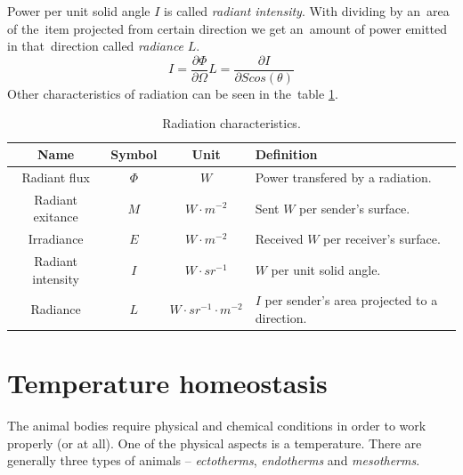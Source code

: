 Power per unit solid angle $I$ is called {\it radiant intensity}. With dividing by an~area of the~item
projected from certain direction we get an~amount of power emitted in that~direction called {\it radiance} $L$.
\begin{subequations}
\begin{equation}
I = \frac{\partial \Phi}{\partial \Omega}
\end{equation}
\begin{equation}
L = \frac{\partial I}{\partial S cos(\theta)}
\end{equation}
\end{subequations}
Other characteristics of radiation can be seen in the~table \ref{table:units}. \cite{iso800007} \cite{TemperatureMeasuring}

\begin{table}
\begin{tabular}{|c|c|c|l|} \hline
\textbf{Name}             & \textbf{Symbol} & \textbf{Unit}                 & \textbf{Definition}                             \\ \hline
Radiant flux        & $\Phi$          & $W$                           & Power transfered by a radiation.                \\ \hline
Radiant exitance    & $M$             & $W\cdot m^{-2}$               & Sent $W$ per sender's surface.                  \\ \hline 
Irradiance          & $E$             & $W\cdot m^{-2}$               & Received $W$ per receiver's surface.            \\ \hline
Radiant intensity   & $I$             & $W\cdot sr^{-1}$              & $W$ per unit solid angle.                       \\ \hline
Radiance            & $L$             & $W\cdot sr^{-1}\cdot m^{-2}$  & $I$ per sender's area projected to a direction. \\ \hline
\end{tabular}
\caption{Radiation characteristics.\label{table:units} \cite{TemperatureMeasuring}}
\end{table}



\newpage
\section{Temperature homeostasis}
The animal bodies require physical and chemical conditions in order to work properly (or at all). One of
the physical aspects is a temperature. There are generally three types of animals -- {\it ectotherms},
{\it endotherms} and {\it mesotherms}.

